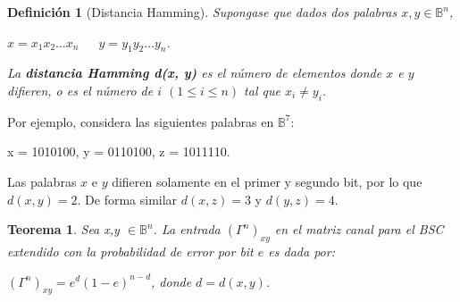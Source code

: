 \documentclass{beamer}
\theoremstyle{plain}
\newtheorem{teorema} [Teorema] {Teorema}
\newtheorem{definicion} [Definicion]{Definición}
\theoremstyle{example}
\theoremstyle{example}
\begin{document}
\begin{frame}  \footnotesize

\begin{definicion}[Distancia Hamming]
Supongase que dados dos palabras $x,y \in \mathbb{B}^n$,

\begin{center}
$x = x_1x_2 \ldots x_n$	$\;\,\,\;\,\,y = y_1y_2 \ldots y_n$.
\end{center}

La \textbf{distancia Hamming d(x, y)} es el número de elementos donde $x$ e $y$ difieren, o es el número de $i$ $(1\leq i \leq n)$ tal que $x_i \neq y_i$.

\end{definicion}

Por ejemplo, considera las siguientes palabras en $\mathbb{B}^7$:

\begin{center}
x = 1010100,	y = 0110100,	z = 1011110.
\end{center}

Las palabras $x$ e $y$ difieren solamente en el primer y segundo bit, por lo que $d(x,y) = 2$. De forma similar $d(x, z) = 3$ y $d(y, z) = 4$.

\begin{teorema}

Sea x,y $\in \mathbb{B}^n$. La entrada $(\Gamma^n)_{xy}$ en el matriz canal para el BSC extendido con la probabilidad de error por bit $e$ es dada por:

\begin{center}
$(\Gamma^n)_{xy} =e^d(1-e)^{n-d}$, donde $d=d(x,y)$.
\end{center}

\end{teorema}

\end{frame} 

\end{document}
